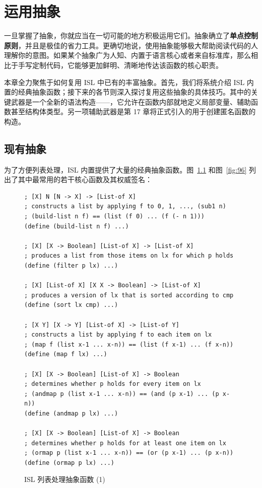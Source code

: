 
\chapter{运用抽象}
\label{sec:ch16_using_abstractions}

一旦掌握了抽象，你就应当在一切可能的地方积极运用它们。抽象确立了\textbf{单点控制原则}，并且是极佳的省力工具。更确切地说，使用抽象能够极大帮助阅读代码的人理解你的意图。如果某个抽象广为人知、内置于语言核心或者来自标准库，那么相比于手写定制代码，它能够更加鲜明、清晰地传达该函数的核心职责。

本章全力聚焦于如何复用 ISL 中已有的丰富抽象。首先，我们将系统介绍 ISL 内置的经典抽象函数；接下来的各节则深入探讨复用这些抽象的具体技巧。其中的关键武器是一个全新的语法构造——，它允许在函数内部就地定义局部变量、辅助函数甚至结构体类型。另一项辅助武器是第 17 章将正式引入的用于创建匿名函数的  构造。

\section{现有抽象}
\label{sec:16_1}

为了方便列表处理，ISL 内置提供了大量的经典抽象函数。图~\ref{fig:95} 和图~\ref{fig:96} 列出了其中最常用的若干核心函数及其权威签名：

\begin{figure}[htbp]
  \centering
\begin{lstlisting}[language=BSL, basicstyle=\scriptsize\ttfamily]
; [X] N [N -> X] -> [List-of X]
; constructs a list by applying f to 0, 1, ..., (sub1 n)
; (build-list n f) == (list (f 0) ... (f (- n 1)))
(define (build-list n f) ...)

; [X] [X -> Boolean] [List-of X] -> [List-of X]
; produces a list from those items on lx for which p holds
(define (filter p lx) ...)

; [X] [List-of X] [X X -> Boolean] -> [List-of X]
; produces a version of lx that is sorted according to cmp
(define (sort lx cmp) ...)

; [X Y] [X -> Y] [List-of X] -> [List-of Y]
; constructs a list by applying f to each item on lx
; (map f (list x-1 ... x-n)) == (list (f x-1) ... (f x-n))
(define (map f lx) ...)

; [X] [X -> Boolean] [List-of X] -> Boolean
; determines whether p holds for every item on lx
; (andmap p (list x-1 ... x-n)) == (and (p x-1) ... (p x-n))
(define (andmap p lx) ...)

; [X] [X -> Boolean] [List-of X] -> Boolean
; determines whether p holds for at least one item on lx
; (ormap p (list x-1 ... x-n)) == (or (p x-1) ... (p x-n))
(define (ormap p lx) ...)
\end{lstlisting}
  \caption{ISL 列表处理抽象函数 (1)}
  \label{fig:95}
\end{figure}

